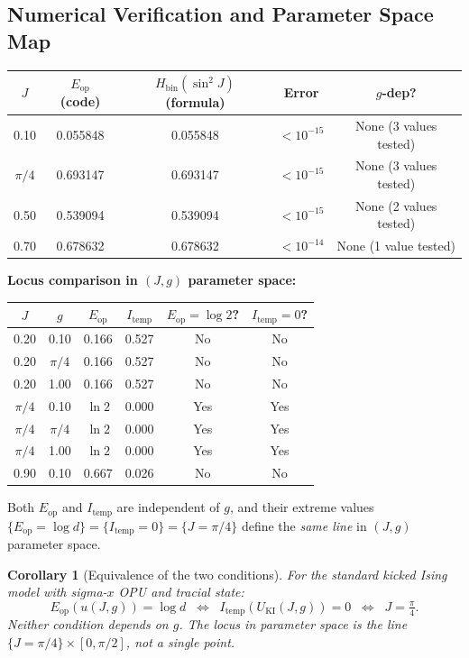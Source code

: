 \documentclass[12pt,a4paper]{article}
\newtheorem{corollary}[theorem]{Corollary}
\begin{document}
\subsection{Numerical Verification and Parameter Space Map}

\begin{center}
\begin{tabular}{@{}ccccc@{}}
\toprule
$J$ & $E_\mathrm{op}$ (code) & $H_\mathrm{bin}(\sin^2 J)$ (formula) & Error & $g$-dep? \\
\midrule
0.10 & 0.055848 & 0.055848 & $< 10^{-15}$ & None (3 values tested) \\
$\pi/4$ & 0.693147 & 0.693147 & $< 10^{-15}$ & None (3 values tested) \\
0.50 & 0.539094 & 0.539094 & $< 10^{-15}$ & None (2 values tested) \\
0.70 & 0.678632 & 0.678632 & $< 10^{-14}$ & None (1 value tested) \\
\bottomrule
\end{tabular}
\end{center}

\noindent
\textbf{Locus comparison in $(J,g)$ parameter space:}

\begin{center}
\begin{tabular}{@{}cccccc@{}}
\toprule
$J$ & $g$ & $E_\mathrm{op}$ & $I_\mathrm{temp}$ & $E_\mathrm{op}=\log 2$? & $I_\mathrm{temp}=0$? \\
\midrule
0.20 & 0.10 & 0.166 & 0.527 & No & No \\
0.20 & $\pi/4$ & 0.166 & 0.527 & No & No \\
0.20 & 1.00 & 0.166 & 0.527 & No & No \\
$\pi/4$ & 0.10 & $\ln 2$ & 0.000 & Yes & Yes \\
$\pi/4$ & $\pi/4$ & $\ln 2$ & 0.000 & Yes & Yes \\
$\pi/4$ & 1.00 & $\ln 2$ & 0.000 & Yes & Yes \\
0.90 & 0.10 & 0.667 & 0.026 & No & No \\
\bottomrule
\end{tabular}
\end{center}

\vspace{4pt}
\noindent
Both $E_\mathrm{op}$ and $I_\mathrm{temp}$ are independent of $g$, and their
extreme values $\{E_\mathrm{op}=\log d\}=\{I_\mathrm{temp}=0\}=\{J=\pi/4\}$
define the \emph{same line} in $(J,g)$ parameter space.

\begin{corollary}[Equivalence of the two conditions]\label{cor:equivalence}
For the standard kicked Ising model with sigma-$x$ OPU and tracial state:
\begin{equation}
  E_\mathrm{op}(u(J,g)) = \log d \;\;\Longleftrightarrow\;\; I_\mathrm{temp}(U_\mathrm{KI}(J,g)) = 0
  \;\;\Longleftrightarrow\;\; J = \tfrac{\pi}{4}.
\end{equation}
Neither condition depends on $g$.  The locus in parameter space is the line
$\{J=\pi/4\}\times[0,\pi/2]$, not a single point.
\end{corollary}
\end{document}
